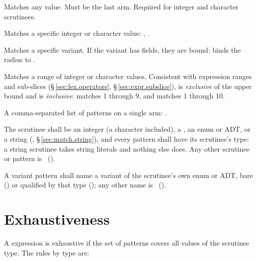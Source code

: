 \begin{description}[leftmargin=2em]
  \item[Wildcard (\lain{else})]
    Matches any value.  Must be the last arm.  Required for integer and
    character scrutinees.

  \item[Literal pattern]
    Matches a specific integer or character value:
    , .

  \item[Enum/ADT variant pattern]
    Matches a specific variant.  If the variant has fields, they are bound:
     binds the radius to .

  \item[Range pattern]
    Matches a range of integer or character values.  Consistent with expression
    ranges and sub-slices (\S\,\ref{sec:lex.operators}, \S\,\ref{sec:expr.subslice}),
     is \emph{exclusive} of the upper bound and  is
    \emph{inclusive}:  matches 1 through 9, and 
    matches 1 through 10.

  \item[Multi-pattern (OR)]
    A comma-separated list of patterns on a single arm:
    .
\end{description}

\begin{constraint}
  The scrutinee shall be an integer (a  character included), a
  , an enum or ADT, or a string (, \S\,\ref{sec:match.string}),
  and every pattern shall have its scrutinee's type: a string scrutinee takes
  string literals and nothing else does.  Any other scrutinee or pattern is
  \illformed{}~().
\end{constraint}

\begin{constraint}
  A variant pattern shall name a variant of the scrutinee's own enum or ADT,
  bare () or qualified by that type (); any other
  name is \illformed{}~().
\end{constraint}

\section{Exhaustiveness}
\label{sec:match.exhaustiveness}

\pnum
A  expression is exhaustive if the set of patterns covers all
values of the scrutinee type.  The rules by type are:

